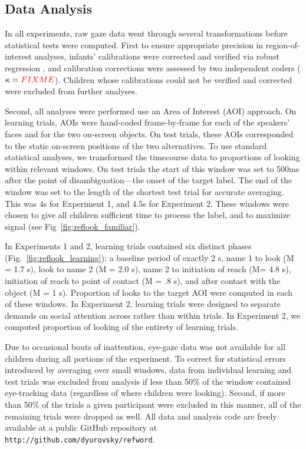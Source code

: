 \documentclass{pnastwo}
\newcommand{\red}[1]{\textcolor{red}{#1}}
\begin{document}
\begin{article}
\begin{materials}
\subsection{Data Analysis}

In all experiments, raw gaze data went through several transformations before statistical tests were computed. First to ensure appropriate precision in region-of-interest analyses, infants' calibrations were corrected and verified via robust regression \cite[described in][]{frank2012}, and calibration corrections were assessed by two independent coders ($\kappa = \red{FIXME}$). Children whose calibrations could not be verified and corrected were excluded from further analyses.

Second, all analyses were performed use an Area of Interest (AOI) approach. On learning trials, AOIs were hand-coded frame-by-frame for each of the speakers' faces and for the two on-screen objects. On test trials, these AOIs corresponded to the static on-screen positions of the two alternatives. To use standard statistical analyses, we transformed the timecourse data to proportions of looking within relevant windows. On test trials the start of this window was set to 500ms after the point of disambiguation---the onset of the target label. The end of the window was set to the length of the shortest test trial for accurate averaging. This was 4s for Experiment 1, and 4.5s for Experiment 2. These windows were chosen to give all children sufficient time to process the label, and to maximize signal (see Fig~\ref{fig:reflook_familiar}).

In Experiments 1 and 2, learning trials contained six distinct phases (Fig.~\ref{fig:reflook_learning}): a baseline period of exactly 2 s, name 1 to look (M = 1.7 s), look to name 2 (M = 2.0 s), name 2 to initiation of reach (M= 4.8 s), initiation of reach to point of contact (M = .8 s), and after contact with the object (M = 1 s). Proportion of looks to the target AOI were computed in each of these windows. In Experiment 2, learning trials were designed to separate demands on social attention across rather than within trials. In Experiment 2, we computed proportion of looking of the entirety of learning trials.

Due to occasional bouts of inattention, eye-gaze data was not available for all children during all portions of the experiment. To correct for statistical errors introduced by averaging over small windows,
data from individual learning and test trials was excluded from analysis if less than 50\% of the window contained eye-tracking data (regardless of where children were looking). Second, if more than 50\% of the trials a given participant were excluded in this manner, all of the remaining trials were dropped as well. All data and analysis code are freely available at a public GitHub repository at \small{\tt{http://github.com/dyurovsky/refword}}.


\end{materials}
\end{article}
\end{document}
